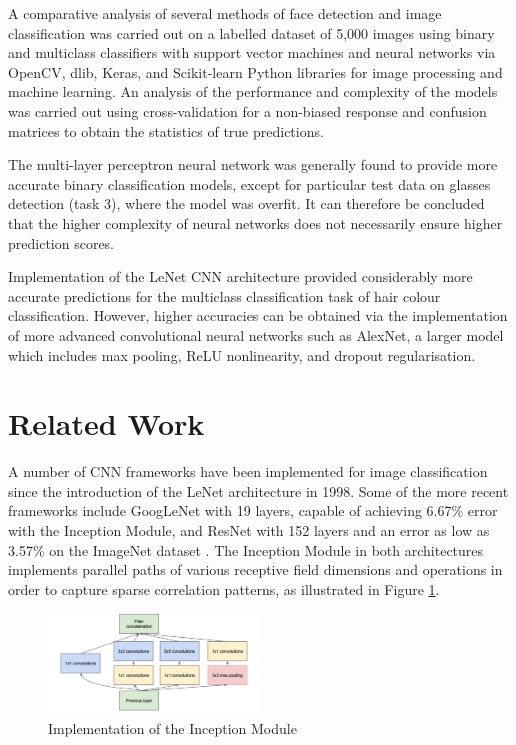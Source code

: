 \documentclass[conference]{IEEEtran}
\begin{document}
A comparative analysis of several methods of face detection and image classification was carried out on a labelled dataset of 5,000 images using binary and multiclass classifiers with support vector machines and neural networks via OpenCV, dlib, Keras, and Scikit-learn Python libraries for image processing and machine learning. An analysis of the performance and complexity of the models was carried out using cross-validation for a non-biased response and confusion matrices to obtain the statistics of true predictions. 

The multi-layer perceptron neural network was generally found to provide more accurate binary classification models, except for particular test data on glasses detection (task 3), where the model was overfit. It can therefore be concluded that the higher complexity of neural networks does not necessarily ensure higher prediction scores.

Implementation of the LeNet CNN architecture provided considerably more accurate predictions for the multiclass classification task of hair colour classification. However, higher accuracies can be obtained via the implementation of more advanced convolutional neural networks such as AlexNet, a larger model which includes max pooling, ReLU nonlinearity, and dropout regularisation.

\section{Related Work} \label{s-rel-work}


A number of CNN frameworks have been implemented for image classification since the introduction of the LeNet architecture in 1998. Some of the more recent frameworks include GoogLeNet with 19 layers, capable of achieving 6.67\% error with the Inception Module,
and ResNet with 152 layers and an error as low as 3.57\% on the ImageNet dataset \cite{He2006}. The Inception Module in both architectures implements parallel paths of various receptive field dimensions and operations in order to capture sparse correlation patterns, as illustrated in Figure \ref{fig: GoogLeNet}.

\begin{figure} [h] %
  \centering
    \includegraphics[width=0.5\textwidth]{graphs/GoogLeNet} 
    \caption{Implementation of the Inception Module \cite{Szegedy2015}}
    \label{fig: GoogLeNet}
\end{figure}
\end{document}
